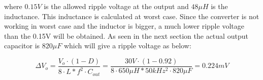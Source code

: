where $0.15V$ is the allowed ripple voltage at the output and $48\mu H$ is the inductance. This inductance is calculated at worst case. 
Since the converter is not working in worst case and the inductor is bigger, a much lower ripple voltage than the 0.15V will be obtained. As seen in the next section the actual output capacitor is $820\mu F$ which will give a ripple voltage as below:

\begin{equation} \label{buckc} 
\Delta V_o = \frac{V_{o}\cdot (1-D)}{8\cdot L*f^2\cdot C_{out}} = \frac{30V\cdot (1-0.92)}{8\cdot 650\mu H*50kHz^2\cdot 820\mu F} = 0.224mV
\end{equation}
   